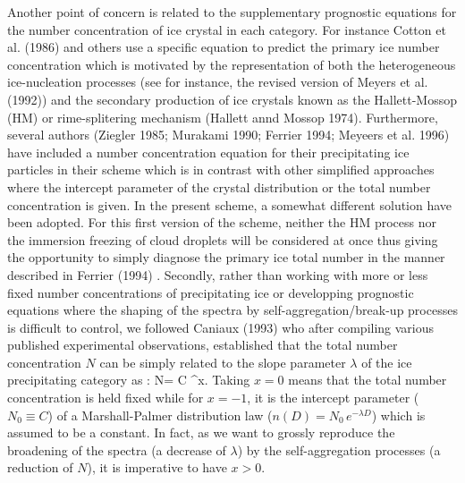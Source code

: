 Another point of concern is related to the supplementary prognostic equations
for the number concentration of ice crystal in each category. For instance
Cotton et al. (1986) and others use a specific equation to predict the primary
ice number concentration which is motivated by the representation of both the
heterogeneous ice-nucleation processes (see for instance, the revised version of
Meyers et al. (1992)) and the secondary production of ice crystals known as the
Hallett-Mossop (HM) or rime-splitering mechanism (Hallett annd Mossop 1974).
Furthermore, several authors (Ziegler 1985; Murakami 1990; Ferrier 1994;
Meyeers et al. 1996) have included a number concentration equation
for their precipitating ice particles in their scheme which is in contrast with
other simplified approaches where the intercept parameter of the crystal
distribution or the total number concentration is given. In the present scheme,
a somewhat different solution have been adopted. For this first version of the
scheme, neither the HM process nor the immersion freezing of cloud droplets
will be
considered at once thus giving the opportunity to simply diagnose\footnotemark
%
%
the primary ice total number in the manner described in Ferrier (1994)\footnotemark
{}. Secondly, rather than working with more or less
fixed number concentrations of precipitating ice or developping prognostic
equations where the shaping of the spectra by self-aggregation/break-up
processes is difficult to control, we followed Caniaux (1993) who after
compiling various published experimental observations, established that the
total number concentration $N$ can be simply related to the slope parameter
$\lambda$ of the ice precipitating category as\footnotemark
{}:
%
\be\label{eq1}
N= C \lambda^x.
\ee
%
\noindent Taking $x=0$ means that the total number concentration is held fixed
while for $x=-1$, it is the intercept parameter ($N_0 \equiv C$) of a
Marshall-Palmer distribution law ($n(D)=N_0\,e^{-\lambda D}$) which is assumed
to be a constant. In fact, as we want to grossly reproduce the broadening of
the spectra (a decrease of $\lambda$) by the self-aggregation processes (a
reduction of $N$), it is imperative to have $x>0$.

